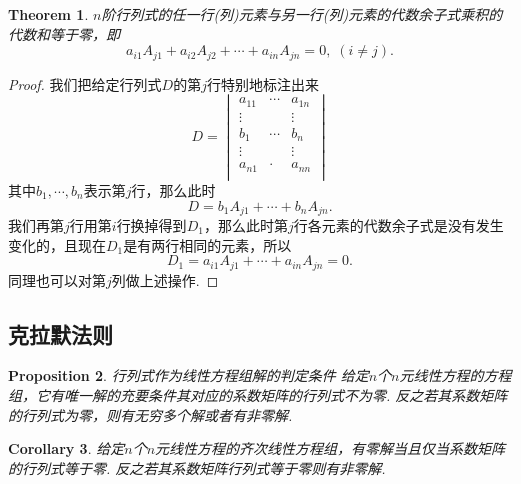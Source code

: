 \documentclass{article}
\newtheorem{theorem}{Theorem}[section]
\newtheorem{corollary}[theorem]{Corollary}
\newtheorem{proposition}[theorem]{Proposition}
\begin{document}
\begin{theorem}\label{hls: zk2}
\rm $n$阶行列式的任一行(列)元素与另一行(列)元素的代数余子式乘积的代数和等于零，即
$$
a_{i1}A_{j1} + a_{i2}A_{j2} + \cdots + a_{in}A_{jn} = 0,\;(i\neq j).
$$
\end{theorem}


\begin{proof}
我们把给定行列式$D$的第$j$行特别地标注出来
$$
D=
\begin{vmatrix}
a_{11} & \cdots & a_{1n} \\
\vdots && \vdots \\
b_1 & \cdots & b_n \\
\vdots && \vdots \\
a_{n1} & \cdot & a_{nn} \\
\end{vmatrix}
$$
其中$b_1,\cdots,b_n$表示第$j$行，那么此时
$$
D = b_1A_{j1} + \cdots +b_nA_{jn}.
$$
我们再第$j$行用第$i$行换掉得到$D_1$，那么此时第$j$行各元素的代数余子式是没有发生变化的，且现在$D_1$是有两行相同的元素，所以
$$
D_1 = a_{i1}A_{j1} + \cdots + a_{in}A_{jn} = 0.
$$
同理也可以对第$j$列做上述操作.
\end{proof}

\newpage
\subsection{克拉默法则}

\begin{proposition}
\rm {\color{red} 行列式作为线性方程组解的判定条件} 给定$n$个$n$元线性方程的方程组，它有唯一解的充要条件其对应的系数矩阵的行列式不为零. 反之若其系数矩阵的行列式为零，则有无穷多个解或者有非零解.
\end{proposition}

\begin{corollary}
\rm 给定$n$个$n$元线性方程的齐次线性方程组，有零解当且仅当系数矩阵的行列式等于零. 反之若其系数矩阵行列式等于零则有非零解.
\end{corollary}
\end{document}
